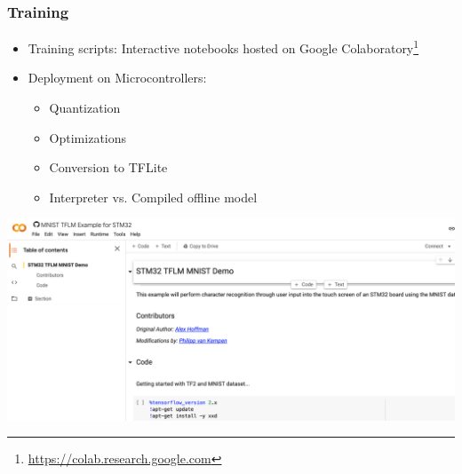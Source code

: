 \documentclass{tum-presentation}
\begin{document}
\begin{frame}
  \frametitle{Training}
  
  \begin{itemize}
      \item Training scripts: Interactive notebooks hosted on Google Colaboratory\footnote{\url{https://colab.research.google.com}}
      \item Deployment on Microcontrollers:
      \begin{itemize}
          \item Quantization
          \item Optimizations
          \item Conversion to TFLite
          \item Interpreter vs. Compiled offline model
      \end{itemize}
  \end{itemize}
  \vspace{-5em}
  \hspace{20em}\includegraphics[width=.7\textwidth]{figures/screen_colab.png}
\end{frame}
\end{document}
